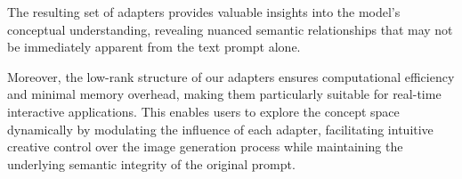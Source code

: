 The resulting set of adapters provides valuable insights into the model's conceptual understanding, revealing nuanced semantic relationships that may not be immediately apparent from the text prompt alone.

Moreover, the low-rank structure of our adapters ensures computational efficiency and minimal memory overhead, making them particularly suitable for real-time interactive applications. This enables users to explore the concept space dynamically by modulating the influence of each adapter, facilitating intuitive creative control over the image generation process while maintaining the underlying semantic integrity of the original prompt.
